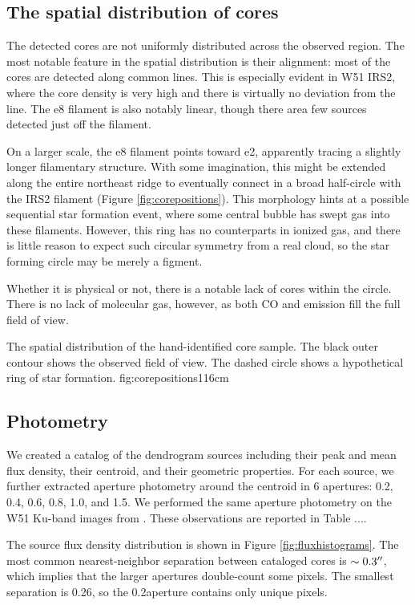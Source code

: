 \documentclass{aa}
\begin{document}
\subsection{The spatial distribution of cores}
The detected cores are not uniformly distributed across the observed region.
The most notable feature in the spatial distribution is their alignment: most
of the cores are detected along common lines.  This is especially evident
in W51 IRS2, where the core density is very high and there is virtually no
deviation from the line.  The e8 filament is also notably linear, though there
area few sources detected just off the filament. 

On a larger scale, the e8 filament points toward e2, apparently tracing a
slightly longer filamentary structure.  With some imagination, this might be
extended along the entire northeast ridge to eventually connect in a broad
half-circle with the IRS2 filament (Figure \ref{fig:corepositions}).  This
morphology hints at a possible sequential star formation event, where some
central bubble has swept gas into these filaments.  However, this ring has no
counterparts in ionized gas, and there is little reason to expect such circular
symmetry from a real cloud, so the star forming circle may be merely a figment.

Whether it is physical or not, there is a notable lack of cores within the
circle.  There is no lack of molecular gas, however, as both CO and \formaldehyde
emission fill the full field of view.

{The spatial distribution of the hand-identified core sample.
The black outer contour shows the observed field of view.
The dashed circle shows a hypothetical ring of star formation.
}{fig:corepositions}{1}{16cm}

\subsection{Photometry}
We created a catalog of the dendrogram sources including their peak and mean
flux density, their centroid, and their geometric properties.  For each source,
we further extracted aperture photometry around the centroid in 6 apertures:
0.2, 0.4, 0.6, 0.8, 1.0, and 1.5\arcsec.  We performed the same aperture
photometry on the W51 Ku-band images from \citet{Ginsburg2016a}.  These
observations are reported in Table {...}.

The source flux density distribution is shown in Figure
\ref{fig:fluxhistograms}.  The most common nearest-neighbor separation between
cataloged cores is $\sim0.3\mbox{$^{\prime\prime}$}$, which implies that the larger apertures
double-count some pixels.  The smallest separation is
0.26\arcsec, so the 0.2\arcsec aperture contains only unique pixels.
\end{document}
